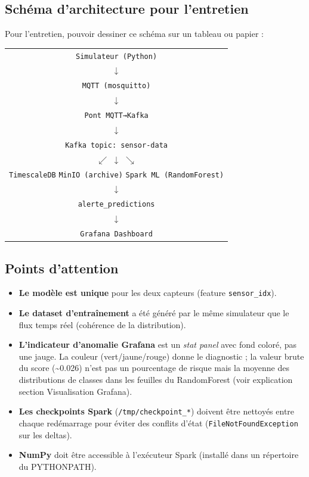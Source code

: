 \documentclass[12pt,a4paper]{article}
\begin{document}
\subsection{Schéma d'architecture pour l'entretien}

Pour l'entretien, pouvoir dessiner ce schéma sur un tableau ou papier :

\begin{center}
\small
\begin{tabular}{c}
\texttt{Simulateur (Python)} \\ $\downarrow$ \\ \texttt{MQTT (mosquitto)} \\ $\downarrow$ \\ \texttt{Pont MQTT→Kafka} \\ $\downarrow$ \\ \texttt{Kafka topic: sensor-data} \\ $\swarrow$ \quad $\downarrow$ \quad $\searrow$ \\
\texttt{TimescaleDB} \quad \texttt{MinIO (archive)} \quad \texttt{Spark ML (RandomForest)} \\
\qquad\qquad\qquad\qquad\qquad\qquad $\downarrow$ \\
\qquad\qquad\qquad\qquad\qquad\qquad \texttt{alerte\_predictions} \\
\qquad\qquad\qquad\qquad\qquad\qquad $\downarrow$ \\
\qquad\qquad\qquad\qquad\qquad\qquad \texttt{Grafana Dashboard} \\
\end{tabular}
\end{center}

\subsection{Points d'attention}

\begin{itemize}
    \item \textbf{Le modèle est unique} pour les deux capteurs (feature \texttt{sensor\_idx}).
    \item \textbf{Le dataset d'entraînement} a été généré par le même simulateur que le flux temps réel (cohérence de la distribution).
    \item \textbf{L'indicateur d'anomalie Grafana} est un \textit{stat panel} avec fond coloré, pas une jauge. La couleur (vert/jaune/rouge) donne le diagnostic ; la valeur brute du score (\textasciitilde0.026) n'est pas un pourcentage de risque mais la moyenne des distributions de classes dans les feuilles du RandomForest (voir explication section Visualisation Grafana).
    \item \textbf{Les checkpoints Spark} (\texttt{/tmp/checkpoint\_*}) doivent être nettoyés entre chaque redémarrage pour éviter des conflits d'état (\texttt{FileNotFoundException} sur les deltas).
    \item \textbf{NumPy} doit être accessible à l'exécuteur Spark (installé dans un répertoire du PYTHONPATH).
\end{itemize}
\end{document}
